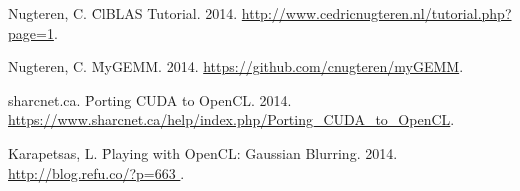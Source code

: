 \begin{thebibliography}{4}
{Nugteren, C. \f{ClBLAS Tutorial}. 2014. \url{http://www.cedricnugteren.nl/tutorial.php?page=1}.}

{Nugteren, C. \f{MyGEMM}. 2014. \url{https://github.com/cnugteren/myGEMM}.}

{sharcnet.ca. \f{Porting CUDA to OpenCL}. 2014. \url{https://www.sharcnet.ca/help/index.php/Porting_CUDA_to_OpenCL}.}

{Karapetsas, L. \f{Playing with OpenCL: Gaussian Blurring}. 2014. \url{ http://blog.refu.co/?p=663 }.}

​
\end{thebibliography}
